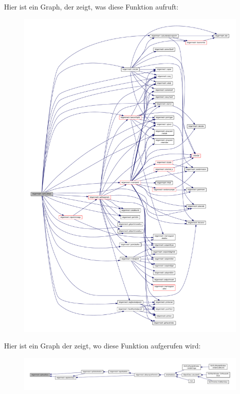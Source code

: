 Hier ist ein Graph, der zeigt, was diese Funktion aufruft\-:\nopagebreak
\begin{figure}[H]
\begin{center}
\leavevmode
\includegraphics[width=350pt]{classtetgenmesh_a3a8404870ab3c2e8ce4312d48c2b29f4_cgraph}
\end{center}
\end{figure}




Hier ist ein Graph der zeigt, wo diese Funktion aufgerufen wird\-:\nopagebreak
\begin{figure}[H]
\begin{center}
\leavevmode
\includegraphics[width=350pt]{classtetgenmesh_a3a8404870ab3c2e8ce4312d48c2b29f4_icgraph}
\end{center}
\end{figure}


